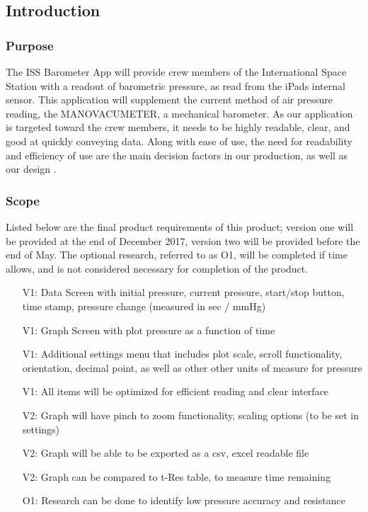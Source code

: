 \documentclass[onecolumn, draftclsnofoot,10pt, compsoc]{IEEEtran}
\def \CapstoneProjectName{ISS Barometer App }
\begin{document}
\subsection{Introduction}
\subsubsection{Purpose}
The \CapstoneProjectName will provide crew members of the International Space Station with a readout of barometric pressure, as read from the iPads internal sensor.
This application will supplement the current method of air pressure reading, the MANOVACUMETER, a mechanical barometer.
As our application is targeted toward the crew members, it needs to be highly readable, clear, and good at quickly conveying data.
Along with ease of use, the need for readability and efficiency of use are the main decision factors in our production, as well as our design \cite{probStat}.

\subsubsection{Scope}
Listed below are the final product requirements of this product; version one will be provided at the end of December 2017, version two will be provided before the end of May.
The optional research, referred to as O1, will be completed if time allows, and is not considered necessary for completion of the product.

\begin{itemize}
\item[V1:] Data Screen with initial pressure, current pressure, start/stop button, time stamp, pressure change (measured in sec / mmHg)
\item[V1:] Graph Screen with plot pressure as a function of time
\item[V1:] Additional settings menu that includes plot scale, scroll functionality, orientation, decimal point, as well as other other units of measure for pressure
\item[V1:] All items will be optimized for efficient reading and clear interface
\item[V2:] Graph will have pinch to zoom functionality, scaling options (to be set in settings)
\item[V2:] Graph will be able to be exported as a csv, excel readable file
\item[V2:] Graph can be compared to t-Res table, to measure time remaining
\item[O1:] Research can be done to identify low pressure accuracy and resistance
\end{itemize}
\end{document}
